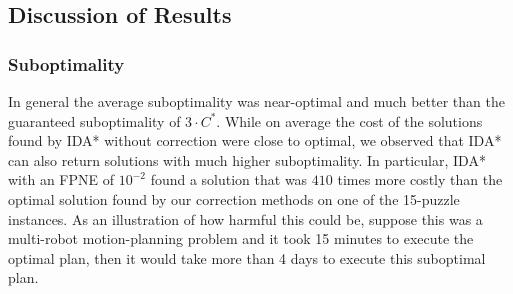\documentclass{article}
\begin{document}
\subsection{Discussion of Results}




\subsubsection{Suboptimality}
In general the average suboptimality was near-optimal and much better than the guaranteed suboptimality of $3\cdot C^*$. While on average the cost of the solutions found by IDA* without correction were close to optimal, we observed that IDA* can also return solutions with much higher suboptimality. In particular, IDA* with an FPNE of $10^{-2}$ found a solution that was $410$ times more costly than %
the optimal solution found by our correction methods 
on one of the 15-puzzle instances. As an illustration of how harmful this could be, suppose this was a multi-robot motion-planning problem and it took 15 minutes to execute the optimal plan, then it would take more than 4 days to execute this suboptimal plan. %
\end{document}
